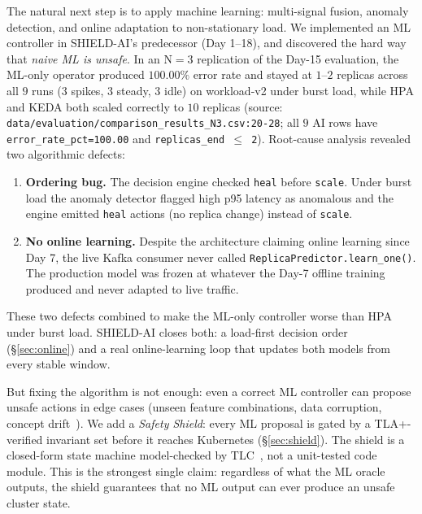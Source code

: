 \documentclass[conference,10pt]{IEEEtran}
\begin{document}
The natural next step is to apply machine learning: multi-signal fusion,
anomaly detection, and online adaptation to non-stationary load.
We implemented an ML controller in SHIELD-AI's predecessor (Day 1--18),
and discovered the hard way that \emph{naive ML is unsafe}. In an N$=3$
replication of the Day-15 evaluation, the ML-only operator produced
$100.00\%$ error rate and stayed at $1$--$2$ replicas across all
$9$ runs ($3$ spikes, $3$ steady, $3$ idle) on workload-v2 under burst
load, while HPA and KEDA both scaled correctly to $10$ replicas
(source: \texttt{data/evaluation/comparison\_results\_N3.csv:20-28};
all $9$ AI rows have \texttt{error\_rate\_pct=100.00} and
\texttt{replicas\_end\,$\le$\,2}). Root-cause analysis revealed two
algorithmic defects:
\begin{enumerate}
    \item \textbf{Ordering bug.} The decision engine checked \texttt{heal}
          before \texttt{scale}. Under burst load the anomaly detector
          flagged high p95 latency as anomalous and the engine emitted
          \texttt{heal} actions (no replica change) instead of
          \texttt{scale}.
    \item \textbf{No online learning.} Despite the architecture claiming
          online learning since Day 7, the live Kafka consumer never
          called \texttt{ReplicaPredictor.learn\_one()}. The production
          model was frozen at whatever the Day-7 offline training
          produced and never adapted to live traffic.
\end{enumerate}

These two defects combined to make the ML-only controller worse than HPA
under burst load. SHIELD-AI closes both: a load-first decision order
(\S\ref{sec:online}) and a real online-learning loop that updates
both models from every stable window.

But fixing the algorithm is not enough: even a correct ML controller
can propose unsafe actions in edge cases (unseen feature combinations,
data corruption, concept drift~\cite{webb_concept_drift_2016}). We add a
\emph{Safety Shield}: every ML proposal is gated by a TLA+-verified
invariant set before it reaches Kubernetes (\S\ref{sec:shield}). The
shield is a closed-form state machine model-checked by TLC~\cite{tlc_doc},
not a unit-tested code module. This is the strongest single claim:
regardless of what the ML oracle outputs, the shield guarantees that no
ML output can ever produce an unsafe cluster state.
\end{document}
